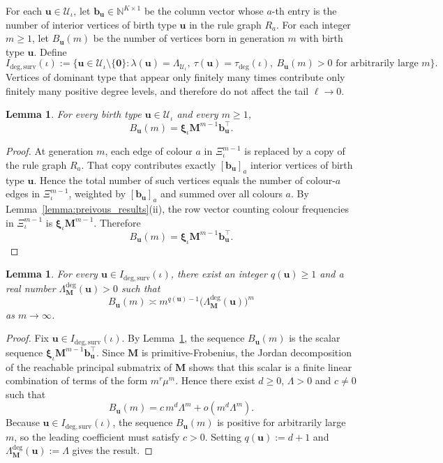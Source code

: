 \documentclass[12pt]{iopart}
\newtheorem{lemma}[theorem]{Lemma}
\newcommand*{\bbbxi}{\boldsymbol{\xi}}
\begin{document}
For each $\mathbf u\in\mathcal U_\iota$, let $\mathbf b_{\mathbf u}\in\mathbb N^{K\times 1}$ be the column vector whose $a$-th entry is the number of interior vertices of birth type $\mathbf u$ in the rule graph $R_a$.
For each integer $m\ge 1$, let $B_{\mathbf u}(m)$ be the number of vertices born in generation $m$ with birth type $\mathbf u$.
Define
\[
I_{\mathrm{deg,surv}}(\iota)
:=
\big\{
\mathbf u\in\mathcal U_\iota\setminus\{\mathbf 0\}:
\lambda(\mathbf u)=\Lambda_{\mathcal U_\iota},\
\tau(\mathbf u)=\tau_{\deg}(\iota),\
B_{\mathbf u}(m)>0 \text{ for arbitrarily large } m
\big\}.
\]
Vertices of dominant type that appear only finitely many times contribute only finitely many positive degree levels, and therefore do not affect the tail $\ell\to 0$.

\begin{lemma}\label{lem:birth-count}
For every birth type $\mathbf u\in\mathcal U_\iota$ and every $m\ge 1$,
\[
B_{\mathbf u}(m)
=
\bbbxi_\iota \mathbf M^{m-1}\mathbf b_{\mathbf u}^{\top}.
\]
\end{lemma}

\begin{proof}
At generation $m$, each edge of colour $a$ in $\Xi_\iota^{m-1}$ is replaced by a copy of the rule graph $R_a$.
That copy contributes exactly $[\mathbf b_{\mathbf u}]_a$ interior vertices of birth type $\mathbf u$.
Hence the total number of such vertices equals the number of colour-$a$ edges in $\Xi_\iota^{m-1}$, weighted by $[\mathbf b_{\mathbf u}]_a$ and summed over all colours $a$.
By Lemma~\ref{lemma:preivous_results}(ii), the row vector counting colour frequencies in $\Xi_\iota^{m-1}$ is $\bbbxi_\iota\mathbf M^{m-1}$.
Therefore
\[
B_{\mathbf u}(m)
=
\bbbxi_\iota \mathbf M^{m-1}\mathbf b_{\mathbf u}^{\top}.
\]
\end{proof}

\begin{lemma}\label{lem:birth-count-asymp}
For every $\mathbf u\in I_{\mathrm{deg,surv}}(\iota)$, there exist an integer $q(\mathbf u)\ge 1$ and a real number
$\Lambda_{\mathbf M}^{\deg}(\mathbf u)>0$ such that
\[
B_{\mathbf u}(m)
\asymp
m^{q(\mathbf u)-1}\big(\Lambda_{\mathbf M}^{\deg}(\mathbf u)\big)^m
\]
as $m\to\infty$.
\end{lemma}

\begin{proof}
Fix $\mathbf u\in I_{\mathrm{deg,surv}}(\iota)$.
By Lemma~\ref{lem:birth-count}, the sequence $B_{\mathbf u}(m)$ is the scalar sequence
$\bbbxi_\iota \mathbf M^{m-1}\mathbf b_{\mathbf u}^{\top}$.
Since $\mathbf M$ is primitive-Frobenius, the Jordan decomposition of the reachable principal submatrix of $\mathbf M$ shows that this scalar is a finite linear combination of terms of the form $m^r\mu^m$.
Hence there exist $d\ge 0$, $\Lambda>0$ and $c\ne 0$ such that
\[
B_{\mathbf u}(m)
=
c\,m^d\Lambda^m+o(m^d\Lambda^m).
\]
Because $\mathbf u\in I_{\mathrm{deg,surv}}(\iota)$, the sequence $B_{\mathbf u}(m)$ is positive for arbitrarily large $m$, so the leading coefficient must satisfy $c>0$.
Setting $q(\mathbf u):=d+1$ and $\Lambda_{\mathbf M}^{\deg}(\mathbf u):=\Lambda$ gives the result.
\end{proof}
\end{document}
